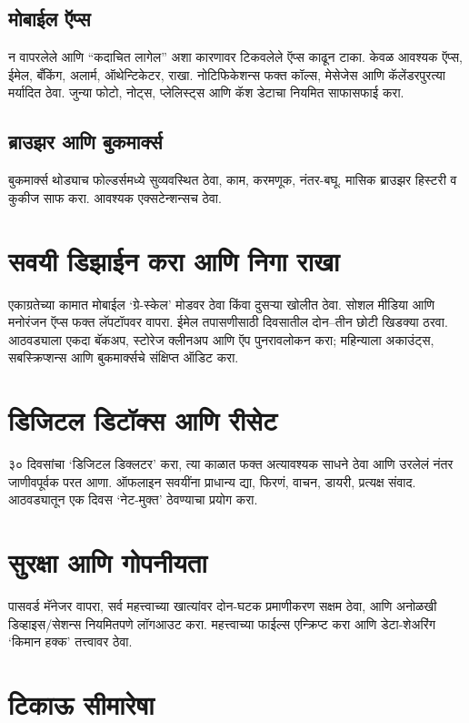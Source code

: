 \subsection*{मोबाईल ऍप्स}

न वापरलेले आणि “कदाचित लागेल” अशा कारणावर टिकवलेले ऍप्स काढून टाका. केवळ आवश्यक ऍप्स, ईमेल, बँकिंग, अलार्म, ऑथेन्टिकेटर, राखा. नोटिफिकेशन्स फक्त कॉल्स, मेसेजेस आणि कॅलेंडरपुरत्या मर्यादित ठेवा. जुन्या फोटो, नोट्स, प्लेलिस्ट्स आणि कॅश डेटाचा नियमित साफासफाई करा.

\subsection*{ब्राउझर आणि बुकमार्क्स}

बुकमार्क्स थोड्याच फोल्डर्समध्ये सुव्यवस्थित ठेवा, काम, करमणूक, नंतर-बघू. मासिक ब्राउझर हिस्टरी व कुकीज साफ करा. आवश्यक एक्सटेन्शन्सच ठेवा.

\section*{सवयी डिझाईन करा आणि निगा राखा}

एकाग्रतेच्या कामात मोबाईल ‘ग्रे-स्केल’ मोडवर ठेवा किंवा दुसऱ्या खोलीत ठेवा. सोशल मीडिया आणि मनोरंजन ऍप्स फक्त लॅपटॉपवर वापरा. ईमेल तपासणीसाठी दिवसातील दोन–तीन छोटी खिडक्या ठरवा. आठवड्याला एकदा बॅकअप, स्टोरेज क्लीनअप आणि ऍप पुनरावलोकन करा; महिन्याला अकाउंट्स, सबस्क्रिप्शन्स आणि बुकमार्क्सचे संक्षिप्त ऑडिट करा.

\section*{डिजिटल डिटॉक्स आणि रीसेट}

३० दिवसांचा ‘डिजिटल डिक्लटर’ करा, त्या काळात फक्त अत्यावश्यक साधने ठेवा आणि उरलेलं नंतर जाणीवपूर्वक परत आणा. ऑफलाइन सवयींना प्राधान्य द्या, फिरणं, वाचन, डायरी, प्रत्यक्ष संवाद. आठवड्यातून एक दिवस ‘नेट-मुक्त’ ठेवण्याचा प्रयोग करा.

\section*{सुरक्षा आणि गोपनीयता}

पासवर्ड मॅनेजर वापरा, सर्व महत्त्वाच्या खात्यांवर दोन-घटक प्रमाणीकरण सक्षम ठेवा, आणि अनोळखी डिव्हाइस/सेशन्स नियमितपणे लॉगआउट करा. महत्त्वाच्या फाईल्स एन्क्रिप्ट करा आणि डेटा-शेअरिंग ‘किमान हक्क’ तत्त्वावर ठेवा.

\section*{टिकाऊ सीमारेषा}

